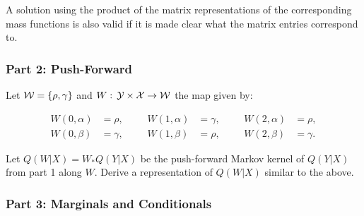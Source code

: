 {A solution using the product of the matrix representations of the corresponding mass functions is also valid if it is made clear
what the matrix entries correspond to.
}

\subsubsection*{Part 2: Push-Forward}

Let $\mathcal{W} = \{ \rho,\gamma \}$ and $W:\, \mathcal{Y} \times \mathcal{X} \to \mathcal{W}$ the map given by:

\begin{align*}
    W(0,\alpha) &= \rho, &&& W(1,\alpha) &= \gamma, &&& W(2,\alpha) &= \rho,\\
    W(0,\beta) &= \gamma, &&& W(1,\beta) &= \rho, &&& W(2,\beta) &= \gamma.
\end{align*}

Let $Q(W|X)=W_*Q(Y|X)$ be the push-forward Markov kernel of $Q(Y|X)$ from part 1 along $W$.
Derive a representation of $Q(W|X)$ similar to the above.



\subsubsection*{Part 3: Marginals and Conditionals}

